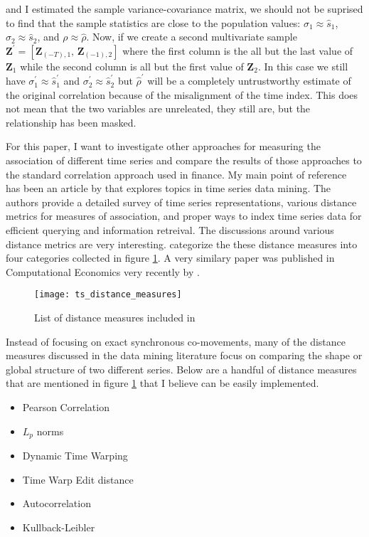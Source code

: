 \documentclass[12pt]{article}
\begin{document}
and I estimated the sample variance-covariance matrix, we should not be suprised to find that the sample statistics are close to the population values: $\sigma_{1} \approx \hat{s}_{1}$, $\sigma_{2} \approx \hat{s}_{2}$, and $\rho \approx \hat{\rho}$. Now, if we create a second multivariate sample $\boldsymbol{Z}^\prime = [\boldsymbol{Z}_{(-T), 1}, \, \boldsymbol{Z}_{(-1), 2}]$ where the first column is the all but the last value of $\boldsymbol{Z}_{1}$ while the second column is all but the first value of $\boldsymbol{Z}_{2}$. In this case we still have $\sigma^{\prime}_{1} \approx \hat{s}^{\prime}_{1}$ and $\sigma^{\prime}_{2} \approx \hat{s}^{\prime}_{2}$ but $\hat{\rho}^{\prime}$ will be a completely untrustworthy estimate of the original correlation because of the misalignment of the time index. This does not mean that the two variables are unreleated, they still are, but the relationship has been masked.

For this paper, I want to investigate other approaches for measuring the association of different time series and compare the results of those approaches to the standard correlation approach used in finance. My main point of reference has been an article by \cite{ElsingAgon2012} that explores topics in time series data mining. The authors provide a detailed survey of time series representations, various distance metrics for measures of association, and proper ways to index time series data for efficient querying and information retreival. The discussions around various distance metrics are very interesting. \cite{ElsingAgon2012} categorize the these distance measures into four categories collected in figure \ref{fig:ds_dist_meas_table}. A very similary paper was published in Computational Economics very recently by \cite{FrancesWiemann2020}.

\begin{figure}[!ht]
    \centering
    \texttt{[image: ts\_distance\_measures]}
    \caption{List of distance measures included in \cite{ElsingAgon2012}}
    \label{fig:ds_dist_meas_table}
  \end{figure}

Instead of focusing on exact synchronous co-movements, many of the distance measures discussed in the data mining literature focus on comparing the shape or global structure of two different series. Below are a handful of distance measures that are mentioned in figure \ref{fig:ds_dist_meas_table} that I believe can be easily implemented.

\begin{itemize}
    \item Pearson Correlation
    \item $L_{p}$ norms
    \item Dynamic Time Warping
    \item Time Warp Edit distance
    \item Autocorrelation
    \item Kullback-Leibler
\end{itemize}
\end{document}
